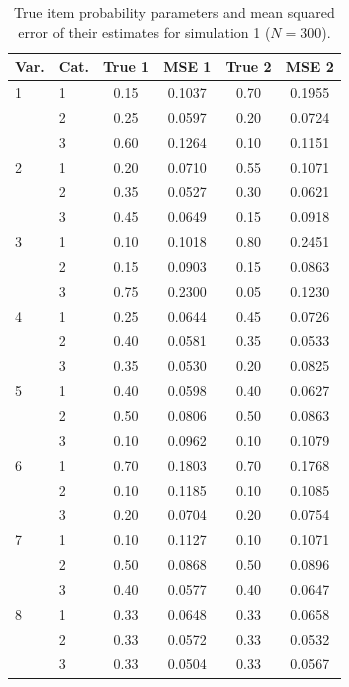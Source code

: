 \begin{table}[H]
\centering
\begin{tabular}{llcccc}
  \toprule
\textbf{Var.} & \textbf{Cat.} & \textbf{True 1} & \textbf{MSE 1} & \textbf{True 2} & \textbf{MSE 2} \\ 
  \midrule
1 & 1 & 0.15 & 0.1037 & 0.70 & 0.1955 \\ 
   & 2 & 0.25 & 0.0597 & 0.20 & 0.0724 \\ 
   & 3 & 0.60 & 0.1264 & 0.10 & 0.1151 \\ 
  2 & 1 & 0.20 & 0.0710 & 0.55 & 0.1071 \\ 
   & 2 & 0.35 & 0.0527 & 0.30 & 0.0621 \\ 
   & 3 & 0.45 & 0.0649 & 0.15 & 0.0918 \\ 
  3 & 1 & 0.10 & 0.1018 & 0.80 & 0.2451 \\ 
   & 2 & 0.15 & 0.0903 & 0.15 & 0.0863 \\ 
   & 3 & 0.75 & 0.2300 & 0.05 & 0.1230 \\ 
  4 & 1 & 0.25 & 0.0644 & 0.45 & 0.0726 \\ 
   & 2 & 0.40 & 0.0581 & 0.35 & 0.0533 \\ 
   & 3 & 0.35 & 0.0530 & 0.20 & 0.0825 \\ 
  5 & 1 & 0.40 & 0.0598 & 0.40 & 0.0627 \\ 
   & 2 & 0.50 & 0.0806 & 0.50 & 0.0863 \\ 
   & 3 & 0.10 & 0.0962 & 0.10 & 0.1079 \\ 
  6 & 1 & 0.70 & 0.1803 & 0.70 & 0.1768 \\ 
   & 2 & 0.10 & 0.1185 & 0.10 & 0.1085 \\ 
   & 3 & 0.20 & 0.0704 & 0.20 & 0.0754 \\ 
  7 & 1 & 0.10 & 0.1127 & 0.10 & 0.1071 \\ 
   & 2 & 0.50 & 0.0868 & 0.50 & 0.0896 \\ 
   & 3 & 0.40 & 0.0577 & 0.40 & 0.0647 \\ 
  8 & 1 & 0.33 & 0.0648 & 0.33 & 0.0658 \\ 
   & 2 & 0.33 & 0.0572 & 0.33 & 0.0532 \\ 
   & 3 & 0.33 & 0.0504 & 0.33 & 0.0567 \\ 
   \bottomrule
\end{tabular}
\caption{True item probability parameters and mean squared error of their estimates for simulation 1 ($N = 300$).} 
\label{table:sim1_item_prob_mse_N300}
\end{table}
